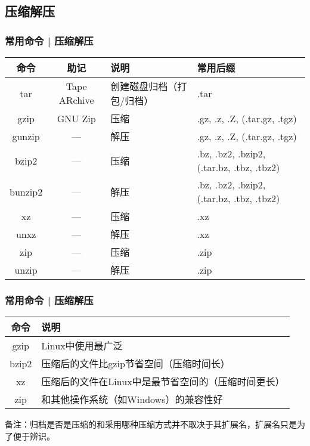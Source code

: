 \subsection{压缩解压}
\begin{frame}
  \frametitle{常用命令 | \alert{压缩解压}}
  \begin{table}
    \centering
    \begin{tabularx}{\textwidth}{ccXX}
      \hline
      \rowcolor{blue!50}命令 & 助记 & 说明 & 常用后缀\\
      \hline
      tar & Tape ARchive & 创建磁盘归档（打包/归档） & .tar\\
      gzip & GNU Zip & 压缩 & .gz, .z, .Z, (.tar.gz, .tgz)\\
      gunzip & --- & 解压 & .gz, .z, .Z, (.tar.gz, .tgz)\\
      bzip2 & --- & 压缩 & .bz, .bz2, .bzip2, (.tar.bz, .tbz, .tbz2)\\
      bunzip2 & --- & 解压 & .bz, .bz2, .bzip2, (.tar.bz, .tbz, .tbz2)\\
      xz & --- & 压缩 & .xz\\
      unxz & --- & 解压 & .xz\\
      zip & --- & 压缩 & .zip\\
      unzip & --- & 解压 & .zip\\
      \hline
    \end{tabularx}
  \end{table}
\end{frame}

\begin{frame}
  \frametitle{常用命令 | \alert{压缩解压}}
  \begin{table}
    \centering
    \begin{tabularx}{\textwidth}{cX}
      \hline
      \rowcolor{blue!50}命令 & 说明\\
      \hline
      gzip & Linux中使用最广泛\\
      bzip2 & 压缩后的文件比gzip节省空间（压缩时间长）\\
      xz & 压缩后的文件在Linux中是最节省空间的（压缩时间更长）\\
      zip & 和其他操作系统（如Windows）的兼容性好\\
      \hline
    \end{tabularx}
  \end{table}
  备注：归档是否是压缩的和采用哪种压缩方式并不取决于其扩展名，扩展名只是为了便于辨识。
\end{frame}

